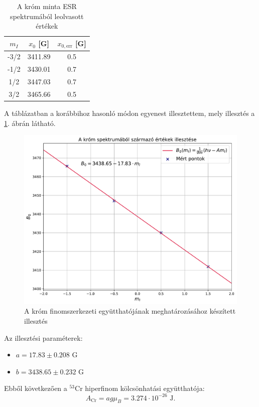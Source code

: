 \documentclass[12pt,a4paper]{article}
\begin{document}
\begin{table}[!h]
\begin{center}
\begin{tabular}{|c|c|c|}
\hline
$m_I$ & $x_0$ [G] & $x_{0,\textrm{err}}$ [G] \\
\hline
-3/2 & 3411.89 & 0.5 \\
\hline
-1/2 & 3430.01 & 0.7\\
\hline
1/2 & 3447.03 & 0.7\\
\hline
3/2 & 3465.66 & 0.5\\
\hline
\end{tabular}
\caption{A króm minta ESR spektrumából leolvasott értékek}
\label{tab:cr}
\end{center}
\end{table}

A táblázatban a korábbihoz hasonló módon egyenest illesztettem, mely illesztés a \ref{fig:cr_ill}. ábrán látható.\\

\begin{figure}[!h]
\centering
\includegraphics[scale=0.5]{cr_fl_fit}
\caption{A króm finomszerkezeti együtthatójának meghatározásához készített illesztés}
\label{fig:cr_ill}
\end{figure}
\newpage
Az illesztési paraméterek:
\begin{itemize}
\item{$a = 17.83 \pm 0.208$ G}
\item{$b = 3438.65 \pm 0.232$ G}
\end{itemize}
Ebből következően a $^{53}$Cr hiperfinom kölcsönhatási együtthatója:
$$A_{\textrm{Cr}}=ag\mu_B=3.274\cdot 10^{-26} \textrm{ J}. $$
\end{document}
